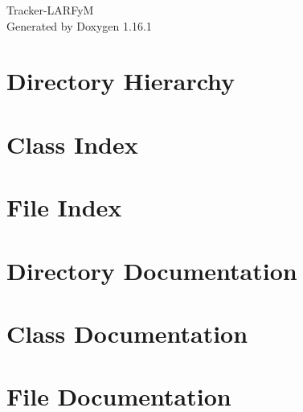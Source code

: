 \documentclass[twoside]{book}
\newcommand{\+}{\discretionary{\mbox{\scriptsize$\hookleftarrow$}}{}{}}
\newcommand{\clearemptydoublepage}{%
    \newpage{\pagestyle{empty}\cleardoublepage}%
  }
\begin{document}
  \raggedbottom
    \hypersetup{pageanchor=false,
                bookmarksnumbered=true,
                pdfencoding=unicode
               }
  \begin{titlepage}
  \vspace*{7cm}
  \begin{center}%
  {\Large Tracker-\/\+LARFyM}\\
  \vspace*{1cm}
  {\large Generated by Doxygen 1.16.1}\\
  \end{center}
  \end{titlepage}
  \clearemptydoublepage
  \tableofcontents
  \clearemptydoublepage
  \hypersetup{pageanchor=true}
\chapter{Directory Hierarchy}

\chapter{Class Index}

\chapter{File Index}

\chapter{Directory Documentation}


\chapter{Class Documentation}





\chapter{File Documentation}





















  \backmatter
  \newpage
  \clearemptydoublepage
  \printindex
\end{document}
